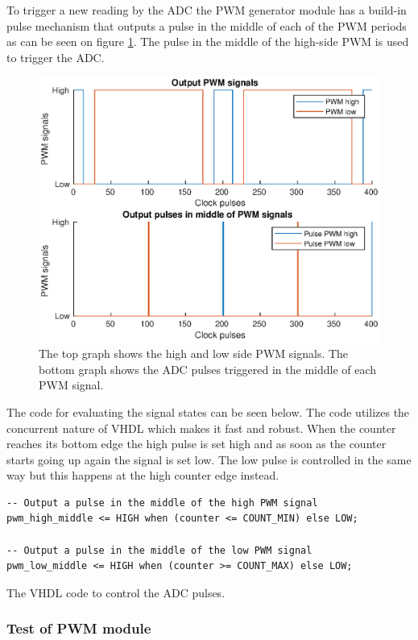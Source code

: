 To trigger a new reading by the ADC the PWM generator module has a build-in pulse mechanism that outputs a pulse in the middle of each of the PWM periods as can be seen on figure \ref{fig:adc_pulses}. The pulse in the middle of the high-side PWM is used to trigger the ADC.

\begin{figure}[H]
	\centering
	\includegraphics[width=0.8 \textwidth]{pictures/software/adc_pulses.eps}
	\caption{The top graph shows the high and low side PWM signals. The bottom graph shows the ADC pulses triggered in the middle of each PWM signal.}
	\label{fig:adc_pulses}
\end{figure}

The code for evaluating the signal states can be seen below. The code utilizes the concurrent nature of VHDL which makes it fast and robust.
When the counter reaches its bottom edge the high pulse is set high and as soon as the counter starts going up again the signal is set low. The low pulse is controlled in the same way but this happens at the high counter edge instead.

\begin{verbatim}
-- Output a pulse in the middle of the high PWM signal
pwm_high_middle <= HIGH when (counter <= COUNT_MIN) else LOW;

-- Output a pulse in the middle of the low PWM signal
pwm_low_middle <= HIGH when (counter >= COUNT_MAX) else LOW;
\end{verbatim}
\begin{center}
    The VHDL code to control the ADC pulses.
\end{center}


\subsubsection*{Test of PWM module}

